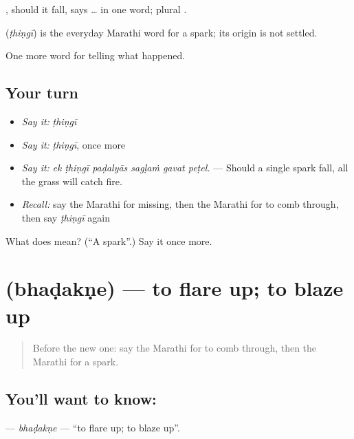 , should it fall, says  …   in one word; plural .

\begin{cousinweb}
\textbf{} (\emph{ṭhiṇgī}) is the everyday Marathi word for a spark; its origin is not settled.
\end{cousinweb}

\begin{grammarlens}[title={What you've built}]
One more word for telling what happened.
\end{grammarlens}

\subsection*{Your turn}
\begin{itemize}
\raggedright
  \item \emph{Say it:} \emph{ṭhiṇgī}
  \item \emph{Say it:} \emph{ṭhiṇgī}, once more
  \item \emph{Say it:} \emph{ek ṭhiṇgī paḍalyās sagḷaṁ gavat peṭel.} — Should a single spark fall, all the grass will catch fire.
  \item \emph{Recall:} say the Marathi for missing, then the Marathi for to comb through, then say \emph{ṭhiṇgī} again
\end{itemize}

\begin{tcolorbox}[breakable,colback=teal!4,colframe=teal!35!black,title={Before you move on}]
What does  mean? (\textquotedblleft{}A spark\textquotedblright{}.) Say it once more.
\end{tcolorbox}
\section[\texorpdfstring{\mr{भडकणे} (bhaḍakṇe)}{भडकणे (bhaḍakṇe)}]{ (bhaḍakṇe) — to flare up; to blaze up}

\label{lesson:MR-C292-bhadakne}



\begin{quote}
Before the new one: say the Marathi for to comb through, then the Marathi for a spark.
\end{quote}

\subsection*{You'll want to know: }
\textbf{} — \emph{bhaḍakṇe} — \textquotedblleft{}to flare up; to blaze up\textquotedblright{}.

